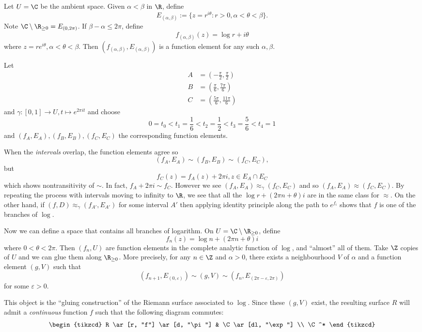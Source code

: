 \documentclass[a4paper]{article}
\begin{document}
\begin{eg}
  Let \(U = \C\) be the ambient space. Given \(\alpha < \beta\) in \(\R\), define
  \[
    E_{(\alpha, \beta)} := \{z = r^{i \theta}: r > 0, \alpha < \theta < \beta\}.
  \]
  Note \(\C \setminus \R_{\geq 0} = E_{(0, 2\pi)}\). If \(\beta - \alpha \leq 2\pi\), define
  \[
    f_{(\alpha, \beta)}(z) = \log r + i\theta
  \]
  where \(z = re^{i\theta}, \alpha < \theta < \beta\). Then \((f_{(\alpha, \beta)}, E_{(\alpha, \beta)})\) is a function element for any such \(\alpha, \beta\).

  Let
  \begin{align*}
    A &= (-\frac{\pi}{2}, \frac{\pi}{2}) \\
    B &= (\frac{\pi}{6}, \frac{7\pi}{6}) \\
    C &= (\frac{5\pi}{6}, \frac{11\pi}{6})
  \end{align*}
  and \(\gamma: [0, 1] \to U, t \mapsto e^{2\pi i t}\) and choose
  \[
    0 = t_0 < t_1 = \frac{1}{6} < t_2 = \frac{1}{2} < t_3 = \frac{5}{6} < t_4 = 1
  \]
  and \((f_A, E_A), (f_B, E_B), (f_C, E_C)\) the corresponding function elements.

  When the \emph{intervals} overlap, the function elements agree so
  \[
    (f_A, E_A) \sim (f_B, E_B) \sim (f_C, E_C),
  \]
  but
  \[
    f_C(z) = f_A(z) + 2\pi i, z \in E_A \cap E_C
  \]
  which shows nontransitivity of \(\sim\). In fact, \(f_A + 2\pi i \sim f_C\). However we see \((f_A, E_A) \approx_\gamma (f_C, E_C)\) and so \((f_A, E_A) \approx (f_C, E_C)\). By repeating the process with intervals moving to infinity to \(\R\), we see that all the \(\log r + (2\pi n + \theta) i\) are in the same class for \(\approx\). On the other hand, if \((f, D) \approx_\gamma (f_{A'}, E_{A'})\) for some interval \(A'\) then applying identity principle along the path to \(e^{f_i}\) shows that \(f\) is one of the branches of \(\log\).

  Now we can define a space that contains all branches of logarithm. On \(U = \C \setminus \R_{\geq 0}\), define
  \[
    f_n(z) = \log n + (2\pi n + \theta)i
  \]
  where \(0 < \theta < 2\pi\). Then \((f_n, U)\) are function elements in the complete analytic function of \(\log\), and ``almost'' all of them. Take \(\Z\) copies of \(U\) and we can glue them along \(\R_{\geq 0}\). More precisely, for any \(n \in \Z\) and \(\alpha > 0\), there exists a neighbourhood \(V\) of \(\alpha\) and a function element \((g, V)\) such that
  \[
    (f_{n + 1}, E_{(0, \varepsilon)}) \sim (g, V) \sim (f_n, E_{(2\pi - \varepsilon, 2\pi)})
  \]
  for some \(\varepsilon > 0\).

  This object is the ``gluing construction'' of the Riemann surface associated to \(\log\). Since these \((g, V)\) exist, the resulting surface \(R\) will admit a \emph{continuous} function \(f\) such that the following diagram commutes:
  \[
    \begin{tikzcd}
      R \ar[r, "f"] \ar[d, "\pi"] & \C \ar[dl, "\exp"] \\
      \C^*
    \end{tikzcd}
  \]
\end{eg}



\printindex
\end{document}
